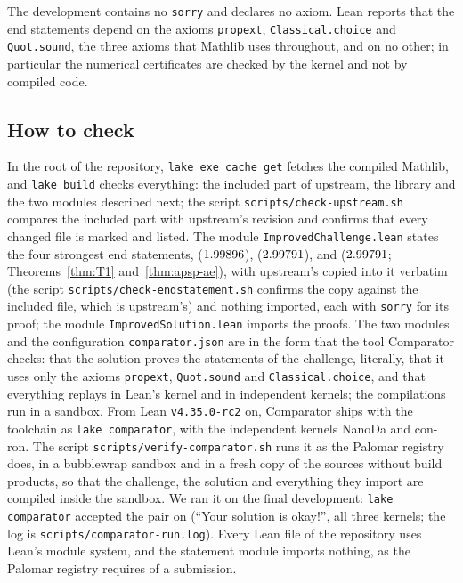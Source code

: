 The development contains no \texttt{sorry} and declares no axiom.  Lean
reports that the end statements depend on the axioms \texttt{propext},
\texttt{Classical.choice} and \texttt{Quot.sound}, the three axioms that
Mathlib uses throughout, and on no other; in particular the numerical
certificates are checked by the kernel and not by compiled code.

\subsection{How to check}

In the root of the repository, \texttt{lake exe cache get} fetches the compiled
Mathlib, and \texttt{lake build} checks everything: the included part of
upstream, the library and the two modules described next; the script
\texttt{scripts/check-upstream.sh} compares the included part with upstream's
revision and confirms that every changed file is marked and listed.  The module \texttt{ImprovedChallenge.lean}
states the four strongest end statements, 
(\(1.99896\)),  (\(2.99791\)),
 and 
(\(2.99791\); Theorems~\ref{thm:T1} and~\ref{thm:apsp-ae}), with
upstream's  copied into it verbatim (the script
\texttt{scripts/check-endstatement.sh} confirms the copy against the included
file, which is upstream's) and nothing imported, each with \texttt{sorry} for
its proof; the module \texttt{ImprovedSolution.lean} imports the proofs.  The
two modules and the configuration \texttt{comparator.json} are in the form
that the tool Comparator \cite{comparator} checks: that the solution proves
the statements of the challenge, literally, that it uses only the axioms
\texttt{propext}, \texttt{Quot.sound} and \texttt{Classical.choice}, and that
everything replays in Lean's kernel and in independent kernels; the
compilations run in a sandbox.  From Lean \texttt{v4.35.0-rc2} on, Comparator
ships with the toolchain as \texttt{lake comparator}, with the independent
kernels NanoDa and con-ron.  The script \texttt{scripts/verify-comparator.sh}
runs it as the Palomar registry does, in a bubblewrap sandbox and in a fresh
copy of the sources without build products, so that the challenge, the
solution and everything they import are compiled inside the sandbox.  We ran it
on the final development: \texttt{lake comparator} accepted the pair on
\ComparatorDate{} (``Your solution is okay!'', all three kernels; the log is
\texttt{scripts/comparator-run.log}).  Every Lean
file of the repository uses Lean's module system, and the statement module
imports nothing, as the Palomar registry \cite{Palomar} requires of a
submission.

